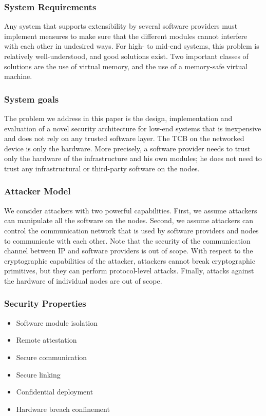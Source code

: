 \documentclass{article}
\begin{document}
\subsubsection{System Requirements}

Any system that supports extensibility by several software providers must implement measures to make sure that the different modules cannot interfere with each other in undesired ways. For high- to mid-end systems, this problem is relatively well-understood, and good solutions exist. Two important classes of solutions are the use of virtual memory, and the use of a memory-safe virtual machine.

\subsubsection{System goals}

The problem we address in this paper is the design, implementation and evaluation of a novel security architecture for low-end systems that is inexpensive and does not rely on any trusted software layer. The TCB on the networked device is only the hardware. More precisely, a software provider needs to trust only the hardware of the infrastructure and his own modules; he does not need to trust any infrastructural or third-party software on the nodes.

\subsubsection{Attacker Model}

We consider attackers with two powerful capabilities. First, we assume attackers can manipulate all the software on the nodes. Second, we assume attackers can control the communication network that is used by software providers and nodes to communicate with each other. Note that the security of the communication channel between IP and software providers is out of scope. With respect to the cryptographic capabilities of the attacker, attackers cannot break cryptographic primitives, but they can perform protocol-level attacks. Finally, attacks against the hardware of individual nodes are out of scope.

\subsubsection{Security Properties}

\begin{itemize}
\item Software module isolation
\item Remote attestation
\item Secure communication
\item Secure linking
\item Confidential deployment
\item Hardware breach confinement
\end{itemize}
\end{document}
